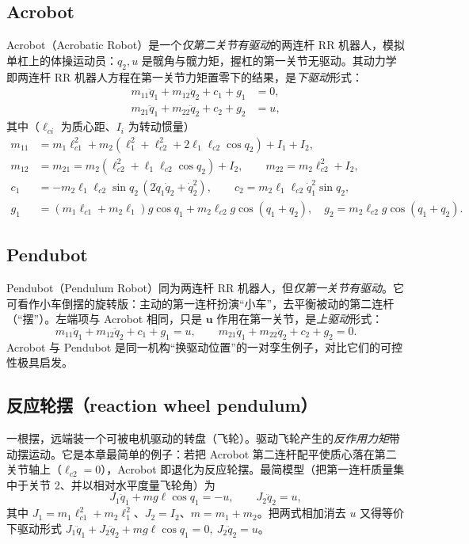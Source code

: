 \subsection{Acrobot}\label{sec:ua-acrobot}
Acrobot（Acrobatic Robot）是一个\emph{仅第二关节有驱动}的两连杆 RR 机器人，模拟单杠上的体操运动员：$q_2,u$ 是髋角与髋力矩，握杠的第一关节无驱动。其动力学即两连杆 RR 机器人方程在第一关节力矩置零下的结果，是\emph{下驱动}形式：
\begin{align}
  m_{11}\ddot{q}_1+m_{12}\ddot{q}_2+c_1+g_1&=0,\label{eq:ua-acro1}\\
  m_{21}\ddot{q}_1+m_{22}\ddot{q}_2+c_2+g_2&=u,\label{eq:ua-acro2}
\end{align}
其中（$\ell_{ci}$ 为质心距、$I_i$ 为转动惯量）
\begin{equation}\label{eq:ua-acro-terms}
\begin{aligned}
  m_{11}&=m_1\ell_{c1}^2+m_2(\ell_1^2+\ell_{c2}^2+2\ell_1\ell_{c2}\cos q_2)+I_1+I_2,\\
  m_{12}&=m_{21}=m_2(\ell_{c2}^2+\ell_1\ell_{c2}\cos q_2)+I_2,\qquad m_{22}=m_2\ell_{c2}^2+I_2,\\
  c_1&=-m_2\ell_1\ell_{c2}\sin q_2\,(2\dot{q}_1\dot{q}_2+\dot{q}_2^2),\qquad c_2=m_2\ell_1\ell_{c2}\dot{q}_1^2\sin q_2,\\
  g_1&=(m_1\ell_{c1}+m_2\ell_1)g\cos q_1+m_2\ell_{c2}g\cos(q_1+q_2),\quad g_2=m_2\ell_{c2}g\cos(q_1+q_2).
\end{aligned}
\end{equation}

\subsection{Pendubot}\label{sec:ua-pendubot}
Pendubot（Pendulum Robot）同为两连杆 RR 机器人，但\emph{仅第一关节有驱动}。它可看作小车倒摆的旋转版：主动的第一连杆扮演“小车”，去平衡被动的第二连杆（“摆”）。左端项与 Acrobot 相同，只是 $\mathbf{u}$ 作用在第一关节，是\emph{上驱动}形式：
\begin{equation}\label{eq:ua-pendubot}
  m_{11}\ddot{q}_1+m_{12}\ddot{q}_2+c_1+g_1=u,\qquad m_{21}\ddot{q}_1+m_{22}\ddot{q}_2+c_2+g_2=0.
\end{equation}
Acrobot 与 Pendubot 是同一机构“换驱动位置”的一对孪生例子，对比它们的可控性极具启发。

\subsection{反应轮摆（reaction wheel pendulum）}\label{sec:ua-rwp}
一根摆，远端装一个可被电机驱动的转盘（飞轮）。驱动飞轮产生的\emph{反作用力矩}带动摆运动。它是本章最简单的例子：若把 Acrobot 第二连杆配平使质心落在第二关节轴上（$\ell_{c2}=0$），Acrobot 即退化为反应轮摆。最简模型（把第一连杆质量集中于关节 2、并以相对水平度量飞轮角）为
\begin{equation}\label{eq:ua-rwp}
  J_1\ddot{q}_1+mg\ell\cos q_1=-u,\qquad J_2\ddot{q}_2=u,
\end{equation}
其中 $J_1=m_1\ell_{c1}^2+m_2\ell_1^2$、$J_2=I_2$、$m=m_1+m_2$。把两式相加消去 $u$ 又得等价下驱动形式 $J_1\ddot{q}_1+J_2\ddot{q}_2+mg\ell\cos q_1=0,\ J_2\ddot{q}_2=u$。

